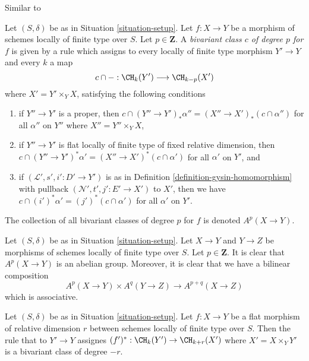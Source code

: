\begin{definition}
\label{definition-bivariant-class}
\begin{reference}
Similar to \cite[Definition 17.1]{F}
\end{reference}
Let $(S, \delta)$ be as in Situation \ref{situation-setup}.
Let $f : X \to Y$ be a morphism of schemes locally of finite type over $S$.
Let $p \in \mathbf{Z}$.
A {\it bivariant class $c$ of degree $p$ for $f$} is given by a rule
which assigns to every locally of finite type morphism $Y' \to Y$
and every $k$ a map
$$
c \cap - : \CH_k(Y') \longrightarrow \CH_{k - p}(X')
$$
where $X' = Y' \times_Y X$, satisfying the following conditions
\begin{enumerate}
\item if $Y'' \to Y'$ is a proper, then
$c \cap (Y'' \to Y')_*\alpha'' = (X'' \to X')_*(c \cap \alpha'')$
for all $\alpha''$ on $Y''$ where $X'' = Y'' \times_Y X$,
\item if $Y'' \to Y'$ is flat locally of finite type of
fixed relative dimension, then
$c \cap (Y'' \to Y')^*\alpha' = (X'' \to X')^*(c \cap \alpha')$
for all $\alpha'$ on $Y'$, and
\item if $(\mathcal{L}', s', i' : D' \to Y')$ is as in
Definition \ref{definition-gysin-homomorphism}
with pullback $(\mathcal{N}', t', j' : E' \to X')$ to $X'$,
then we have $c \cap (i')^*\alpha' = (j')^*(c \cap \alpha')$
for all $\alpha'$ on $Y'$.
\end{enumerate}
The collection of all bivariant classes of degree $p$ for $f$ is
denoted $A^p(X \to Y)$.
\end{definition}

\noindent
Let $(S, \delta)$ be as in Situation \ref{situation-setup}. Let $X \to Y$
and $Y \to Z$
be morphisms of schemes locally of finite type over $S$. Let
$p \in \mathbf{Z}$. It is clear that $A^p(X \to Y)$ is an abelian group.
Moreover, it is clear that we have a bilinear composition
$$
A^p(X \to Y) \times A^q(Y \to Z) \to A^{p + q}(X \to Z)
$$
which is associative.

\begin{lemma}
\label{lemma-flat-pullback-bivariant}
Let $(S, \delta)$ be as in Situation \ref{situation-setup}.
Let $f : X \to Y$ be a flat morphism of relative dimension $r$
between schemes locally of finite type over $S$.
Then the rule that to $Y' \to Y$ assignes
$(f')^* : \CH_k(Y') \to \CH_{k + r}(X')$ where $X' = X \times_Y Y'$
is a bivariant class of degree $-r$.
\end{lemma}

